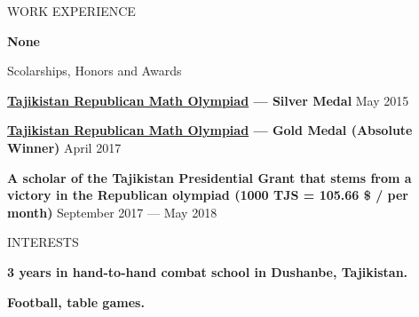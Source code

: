 \documentclass{resume}
\begin{document}



\begin{rSection}{WORK EXPERIENCE} \itemsep -1pt {}  

\item \textbf{None}

\end{rSection}

\begin{rSection}{Scolarships, Honors and Awards} \itemsep -1pt {}  

\item \textbf{\href{http://mri.tj/?page_id=124}{\underline{Tajikistan Republican Math Olympiad}} --- Silver Medal} \hfill May 2015
\item \textbf{\href{http://mri.tj/?page_id=124}{\underline{Tajikistan Republican Math Olympiad}} --- Gold Medal (Absolute Winner)} \hfill April 2017
\item {\textbf{A scholar of the Tajikistan Presidential Grant that stems from a victory in the Republican olympiad (1000 TJS = 105.66 \$ / per month)}} \hfill September 2017 --- May 2018
\end{rSection}


\begin{rSection}{INTERESTS}
\item \textbf{3 years in hand-to-hand combat school in Dushanbe, Tajikistan.}
\item \textbf{Football,  table games.}
\end{rSection}
\end{document}

